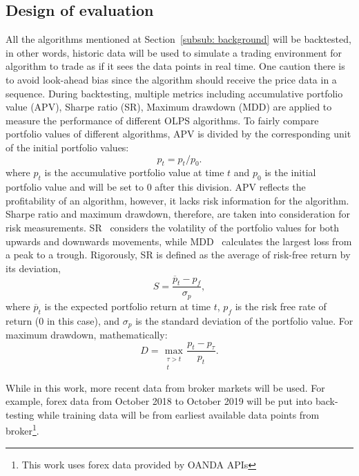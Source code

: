 \subsection{Design of evaluation}
\label{sec: evaluation}

All the algorithms mentioned at Section~\ref{subsub: background} will be backtested, in other words, historic data will be used to simulate a trading environment for algorithm to trade as if it sees the data points in real time. One caution there is to avoid look-ahead bias since the algorithm should receive the price data in a sequence. During backtesting, multiple metrics including accumulative portfolio value (APV), Sharpe ratio (SR), Maximum drawdown (MDD) are applied to measure the performance of different OLPS algorithms. To fairly compare portfolio values of different algorithms, APV is divided by the corresponding unit of the initial portfolio values:
\begin{equation}
    p_t = p_t / p_0.
\end{equation}
where $p_t$ is the accumulative portfolio value at time $t$ and $p_0$ is the initial portfolio value and will be set to $0$ after this division. APV reflects the profitability of an algorithm, however, it lacks risk information for the algorithm. Sharpe ratio and maximum drawdown, therefore, are taken into consideration for risk measurements. SR~\cite{sharpe1964, sharpe1994} considers the volatility of the portfolio values for both upwards and downwards movements, while MDD~\cite{blanchard1979MaxDD, magdon2003maximum} calculates the largest loss from a peak to a trough. Rigorously, SR is defined as the average of risk-free return by its deviation,
\begin{equation} \label{eq:sharpe}
    S = \frac{\overline{p}_t - p_f}{\sigma_p},
\end{equation}
where $\overline{p}_t$ is the expected portfolio return at time $t$, $p_f$ is the risk free rate of return (0 in this case), and $\sigma_p$ is the standard deviation of the portfolio value. For maximum drawdown, mathematically:
\begin{equation} \label{eq:mdd}
	D = \max_{\substack{\tau>t\\ t}} \frac{p_t-p_\tau}{p_t}.
\end{equation}

While in this work, more recent data from broker markets will be used. For example, forex data from October 2018 to October 2019 will be put into back-testing while training data will be from earliest available data points from broker\footnote{This work uses forex data provided by OANDA APIs}.

